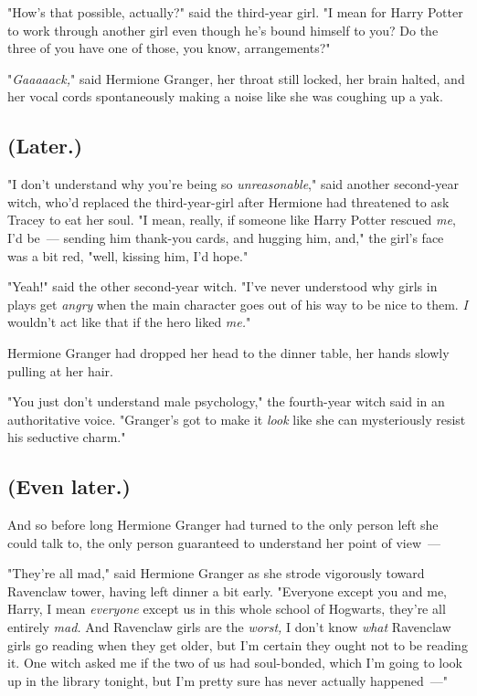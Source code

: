 "How's that possible, actually?" said the third-year girl. "I mean for Harry
Potter to work through another girl even though he's bound himself to you? Do
the three of you have one of those, you know, arrangements?"

"\emph{Gaaaaack,}" said Hermione Granger, her throat still locked, her brain
halted, and her vocal cords spontaneously making a noise like she was coughing
up a yak.
\sbreak
\subsection{(Later.)}

"I don't understand why you're being so \emph{unreasonable}," said another
second-year witch, who'd replaced the third-year-girl after Hermione had
threatened to ask Tracey to eat her soul. "I mean, really, if someone like
Harry Potter rescued \emph{me}, I'd be~--- sending him thank-you cards, and
hugging him, and," the girl's face was a bit red, "well, kissing him, I'd hope."

"Yeah!" said the other second-year witch. "I've never understood why girls in
plays get \emph{angry} when the main character goes out of his way to be nice
to them. \emph{I} wouldn't act like that if the hero liked \emph{me.}"

Hermione Granger had dropped her head to the dinner table, her hands slowly
pulling at her hair.

"You just don't understand male psychology," the fourth-year witch said in an
authoritative voice. "Granger's got to make it \emph{look} like she can
mysteriously resist his seductive charm."
\sbreak
\subsection{(Even later.)}

And so before long Hermione Granger had turned to the only person left she
could talk to, the only person guaranteed to understand her point of view~---

"They're all mad," said Hermione Granger as she strode vigorously toward
Ravenclaw tower, having left dinner a bit early. "Everyone except you and me,
Harry, I mean \emph{everyone} except us in this whole school of Hogwarts,
they're all entirely \emph{mad.} And Ravenclaw girls are the \emph{worst,} I
don't know \emph{what} Ravenclaw girls go reading when they get older, but I'm
certain they ought not to be reading it. One witch asked me if the two of us
had soul-bonded, which I'm going to look up in the library tonight, but I'm
pretty sure has never actually happened~---"

